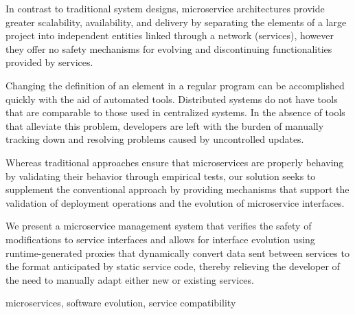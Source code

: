 
%

In contrast to traditional system designs, microservice architectures provide greater
scalability, availability, and delivery by separating the elements of a large project into independent entities linked through a network (services), however they offer no
safety mechanisms for evolving and discontinuing functionalities provided by services.

Changing the definition of an element in a regular program can be accomplished quickly with the aid of automated tools.
Distributed systems do not have tools that are comparable to those used in centralized systems.
In the absence of tools that alleviate this problem,
developers are left with the burden of manually tracking down and resolving problems caused by uncontrolled updates.

Whereas traditional approaches ensure that microservices are properly behaving by validating their behavior through empirical tests,
our solution seeks to supplement the conventional approach by providing mechanisms that support the validation of deployment operations and the evolution of microservice interfaces.

We present a microservice management system that verifies the safety of modifications to service interfaces
and allows for interface evolution using runtime-generated proxies that dynamically convert data sent between services to the format anticipated by static service code,
thereby relieving the developer of the need to manually adapt either new or existing services.

\begin{keywords}
    microservices, software evolution, service compatibility
\end{keywords} 
